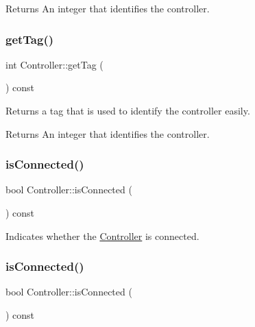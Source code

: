 \begin{DoxyReturn}{Returns}
An integer that identifies the controller. 
\end{DoxyReturn}
\mbox{\label{classController_ae82854fd0c1abb1ebe9cd311b648a3d2}} 
\subsubsection{\texorpdfstring{get\+Tag()}{getTag()}\hspace{0.1cm}{\footnotesize\ttfamily [2/2]}}
{\footnotesize\ttfamily int Controller\+::get\+Tag (\begin{DoxyParamCaption}{ }\end{DoxyParamCaption}) const\hspace{0.3cm}{\ttfamily [inline]}}

Returns a tag that is used to identify the controller easily.

\begin{DoxyReturn}{Returns}
An integer that identifies the controller. 
\end{DoxyReturn}
\mbox{\label{classController_ac2d6cd3552f3ffc8fa6454f0a4ab7692}} 
\subsubsection{\texorpdfstring{is\+Connected()}{isConnected()}\hspace{0.1cm}{\footnotesize\ttfamily [1/2]}}
{\footnotesize\ttfamily bool Controller\+::is\+Connected (\begin{DoxyParamCaption}{ }\end{DoxyParamCaption}) const}

Indicates whether the \hyperlink{classController}{Controller} is connected. \mbox{\label{classController_ac2d6cd3552f3ffc8fa6454f0a4ab7692}} 
\subsubsection{\texorpdfstring{is\+Connected()}{isConnected()}\hspace{0.1cm}{\footnotesize\ttfamily [2/2]}}
{\footnotesize\ttfamily bool Controller\+::is\+Connected (\begin{DoxyParamCaption}{ }\end{DoxyParamCaption}) const}

